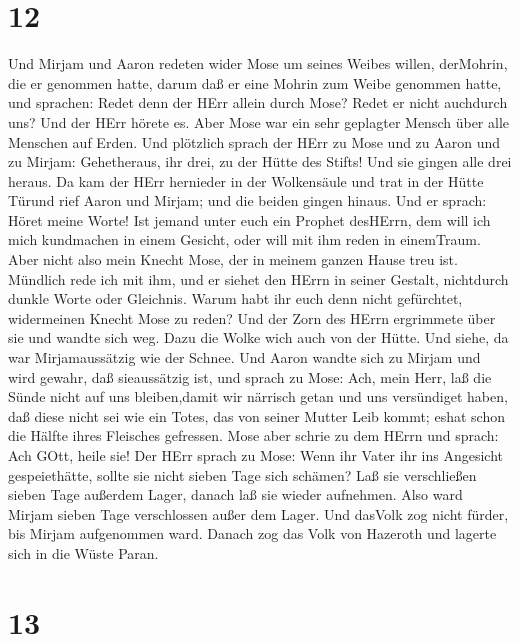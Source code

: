 \hypertarget{section-11}{%
\section{12}\label{section-11}}

 Und Mirjam und Aaron redeten wider Mose um seines Weibes
willen, derMohrin, die er genommen hatte, darum daß er eine Mohrin zum
Weibe genommen hatte,  und sprachen: Redet denn der HErr
allein durch Mose? Redet er nicht auchdurch uns? Und der HErr hörete es.
 Aber Mose war ein sehr geplagter Mensch über alle Menschen
auf Erden.  Und plötzlich sprach der HErr zu Mose und zu
Aaron und zu Mirjam: Gehetheraus, ihr drei, zu der Hütte des Stifts! Und
sie gingen alle drei heraus.  Da kam der HErr hernieder in
der Wolkensäule und trat in der Hütte Türund rief Aaron und Mirjam; und
die beiden gingen hinaus.  Und er sprach: Höret meine Worte!
Ist jemand unter euch ein Prophet desHErrn, dem will ich mich kundmachen
in einem Gesicht, oder will mit ihm reden in einemTraum. 
Aber nicht also mein Knecht Mose, der in meinem ganzen Hause treu ist.
 Mündlich rede ich mit ihm, und er siehet den HErrn in
seiner Gestalt, nichtdurch dunkle Worte oder Gleichnis. Warum habt ihr
euch denn nicht gefürchtet, widermeinen Knecht Mose zu reden?
 Und der Zorn des HErrn ergrimmete über sie und wandte sich
weg.  Dazu die Wolke wich auch von der Hütte. Und siehe, da
war Mirjamaussätzig wie der Schnee. Und Aaron wandte sich zu Mirjam und
wird gewahr, daß sieaussätzig ist,  und sprach zu Mose:
Ach, mein Herr, laß die Sünde nicht auf uns bleiben,damit wir närrisch
getan und uns versündiget haben,  daß diese nicht sei wie
ein Totes, das von seiner Mutter Leib kommt; eshat schon die Hälfte
ihres Fleisches gefressen.  Mose aber schrie zu dem HErrn
und sprach: Ach GOtt, heile sie!  Der HErr sprach zu Mose:
Wenn ihr Vater ihr ins Angesicht gespeiethätte, sollte sie nicht sieben
Tage sich schämen? Laß sie verschließen sieben Tage außerdem Lager,
danach laß sie wieder aufnehmen.  Also ward Mirjam sieben
Tage verschlossen außer dem Lager. Und dasVolk zog nicht fürder, bis
Mirjam aufgenommen ward.  Danach zog das Volk von Hazeroth
und lagerte sich in die Wüste Paran.

\hypertarget{section-12}{%
\section{13}\label{section-12}}

